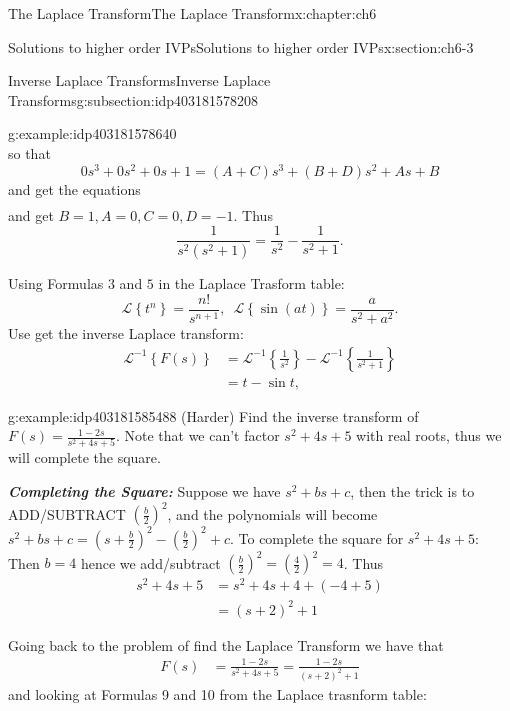 \documentclass[oneside,10pt,]{book}
\newcommand{\alert}[1]{\textbf{\textit{#1}}}
\numberwithin{equation}{section}
\numberwithin{equation}{section}
\newcommand{\amp}{&}
\begin{document}
\begin{chapterptx}{The Laplace Transform}{}{The Laplace Transform}{}{}{x:chapter:ch6}
\begin{sectionptx}{Solutions to higher order IVPs}{}{Solutions to higher order IVPs}{}{}{x:section:ch6-3}
\begin{subsectionptx}{Inverse Laplace Transforms}{}{Inverse Laplace Transforms}{}{}{g:subsection:idp403181578208}
\begin{example}{}{g:example:idp403181578640}
\begin{equation*}
\end{equation*}
so that%
\begin{equation*}
0s^{3}+0s^{2}+0s+1=\left(A+C\right)s^{3}+\left(B+D\right)s^{2}+As+B
\end{equation*}
and get the equations%
\begin{align*}
\end{align*}
and get \(B=1,A=0,C=0,D=-1\). Thus%
\begin{equation*}
\frac{1}{s^{2}\left(s^{2}+1\right)}=\frac{1}{s^{2}}-\frac{1}{s^{2}+1}.
\end{equation*}
%
\par
Using Formulas \(3\) and \(5\) in the Laplace Trasform table:%
\begin{equation*}
\mathcal{L}\left\{ t^{n}\right\} =\frac{n!}{s^{n+1}},\,\,\,\mathcal{L}\left\{ \sin(at)\right\} =\frac{a}{s^{2}+a^{2}}.
\end{equation*}
Use get the inverse Laplace transform:%
\begin{align*}
\mathcal{L}^{-1}\left\{ F(s)\right\}  \amp =\mathcal{L}^{-1}\left\{ \frac{1}{s^{2}}\right\} -\mathcal{L}^{-1}\left\{ \frac{1}{s^{2}+1}\right\} \\
\amp =t-\sin t,
\end{align*}
%
\end{example}
\begin{example}{}{g:example:idp403181585488}%
(Harder) Find the inverse transform of \(F(s)=\frac{1-2s}{s^{2}+4s+5}\). Note that we can't factor \(s^{2}+4s+5\) with real roots, thus we will complete the square.%
\par
\alert{Completing the Square:} Suppose we have \(s^{2}+bs+c\), then the trick is to ADD\slash{}SUBTRACT \(\left(\frac{b}{2}\right)^{2}\), and the polynomials will become \(s^{2}+bs+c=\left(s+\frac{b}{2}\right)^{2}-\left(\frac{b}{2}\right)^{2}+c\). To complete the square for \(s^{2}+4s+5\): Then \(b=4\) hence we add\slash{}subtract \(\left(\frac{b}{2}\right)^{2}=\left(\frac{4}{2}\right)^{2}=4\). Thus%
\begin{align*}
s^{2}+4s+5 \amp =s^{2}+4s+4+\left(-4+5\right)\\
\amp =\left(s+2\right)^{2}+1
\end{align*}
%
\par
Going back to the problem of find the Laplace Transform we have that%
\begin{align*}
F(s) \amp =\frac{1-2s}{s^{2}+4s+5}=\frac{1-2s}{\left(s+2\right)^{2}+1}
\end{align*}
and looking at Formulas 9 and 10 from the Laplace trasnform table:%

\end{example}
\end{subsectionptx}
\end{sectionptx}
\end{chapterptx}
\end{document}
